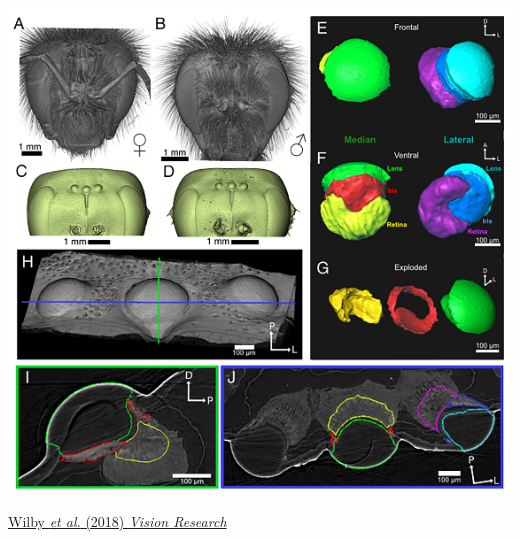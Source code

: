 \documentclass{beamer} %
\begin{document}
  \begin{frame}
    \begin{columns}
      \begin{column}{0.5\textwidth}
        \begin{center}
          \includegraphics[width=\textwidth]{bees.png}
        \end{center}
          \tiny
          \href{https://doi.org/10.1016/j.visres.2019.02.008}{Wilby \textit{et al.} (2018) \textit{Vision Research}}
      \end{column}


\end{columns}
\end{frame}
\end{document}
